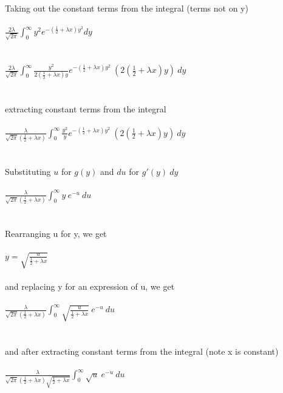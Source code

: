 \documentclass[11pt]{article}   	%
\begin{document}
\\
Taking out the constant terms from the integral (terms not on y) \\
\\
$ \frac{ 2 \lambda }{ \sqrt { 2 \pi } } \displaystyle \int_{0}^{\infty} y^2 e^{ -(\frac{1}{2} + \lambda x) y^2 } dy $ \\
\\\\
$ \frac{ 2 \lambda }{ \sqrt { 2 \pi } } \displaystyle \int_{0}^{\infty} \frac{ y^2 }{ 2(\frac{1}{2} + \lambda x) y } e^{ -(\frac{1}{2} + \lambda x) y^2 } \ ( 2(\frac{1}{2} + \lambda x) y ) \ dy $ \\
\\\\
extracting constant terms from the integral \\
\\
$ \frac{ \lambda }{ \sqrt { 2 \pi } (\frac{1}{2} + \lambda x) } \displaystyle \int_{0}^{\infty} \frac{ y^2 }{ y } e^{ -(\frac{1}{2} + \lambda x) y^2 } \ ( 2(\frac{1}{2} + \lambda x) y ) \ dy $ \\
\\\\
Substituting $ u $ for $ g(y) $ and $ du $ for $ g'(y) \ dy $ \\
\\
$ \frac{ \lambda }{ \sqrt { 2 \pi } (\frac{1}{2} + \lambda x) } \displaystyle \int_{0}^{\infty} y \ e^{-u} \ du $ \\
\\\\
Rearranging u for y, we get \\
\\
$ y = \sqrt { \frac{u}{\frac{1}{2} + \lambda x} } $ \\
\\
and replacing y for an expression of u, we get \\
\\
$ \frac{ \lambda }{ \sqrt { 2 \pi } (\frac{1}{2} + \lambda x) } \displaystyle \int_{0}^{\infty} \sqrt { \frac{u}{\frac{1}{2} + \lambda x} } \ e^{ -u } \ du $ \\
\\\\
and after extracting constant terms from the integral (note x is constant) \\
\\
$ \frac{ \lambda }{ \sqrt { 2 \pi } (\frac{1}{2} + \lambda x) \sqrt{ \frac{1}{2} + \lambda x} } \displaystyle \int_{0}^{\infty} \sqrt { u } \ e^{ -u } \ du $ \\
\end{document}
